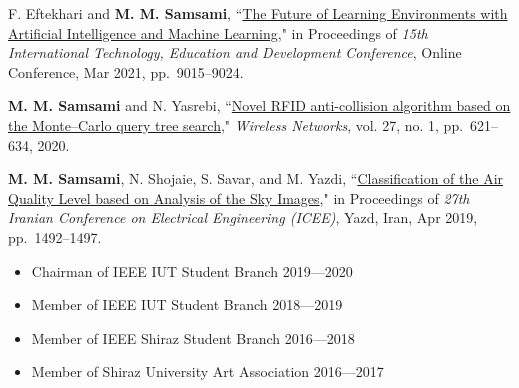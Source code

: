 \documentclass[11pt,a4paper,ragged2e]{altacv}
\begin{document}
\vspace{4mm}
F. Eftekhari and \textbf{M. M. Samsami}, ``\href{http://dx.doi.org/10.21125/inted.2021.1884}{The Future of Learning Environments with Artificial Intelligence and Machine Learning},"  in Proceedings of \textit{15th International Technology, Education and Development Conference}, Online Conference, Mar 2021, pp.~9015--9024.

\divider

\textbf{M. M. Samsami} and N. Yasrebi, ``\href{https://link.springer.com/article/10.1007/s11276-020-02466-1}{Novel RFID anti-collision algorithm based on the Monte–Carlo query tree search}," \textit{Wireless Networks}, vol. 27, no. 1, pp.~621--634, 2020.

\divider

\textbf{M. M. Samsami}, N. Shojaie, S. Savar, and M. Yazdi, ``\href{https://doi.org/10.1109/IranianCEE.2019.8786738}{Classification of the Air Quality Level based on Analysis of the Sky Images}," in Proceedings of \textit{27th Iranian Conference on Electrical Engineering (ICEE)}, Yazd, Iran, Apr 2019, pp.~1492--1497.


\vspace{4mm}
\begin{itemize}
\item Chairman of IEEE IUT Student Branch \hfill2019---2020
\smallskip
\item Member of IEEE IUT Student Branch \hfill2018---2019
\smallskip
\item Member of IEEE Shiraz Student Branch \hfill2016---2018
\smallskip
\item Member of Shiraz University Art Association \hfill2016---2017
\end{itemize}

\nocite{*}






\end{document}
